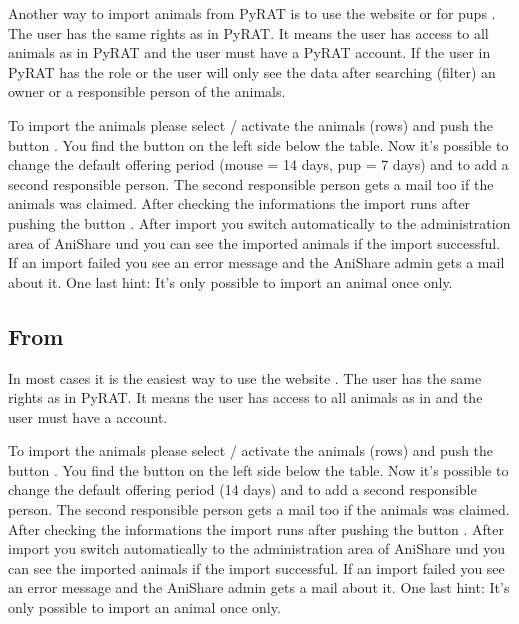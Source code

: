 \documentclass[letterpaper,10pt,openany,oneside,english]{sphinxmanual}
\begin{document}
Another way to import animals from PyRAT is to use the website  or for pups
. The user has the same rights as in PyRAT. It means the user has access to all animals
as in PyRAT and the user must have a PyRAT account. If the user in PyRAT has the role  or  the user will only
see the data after searching (filter) an owner or a responsible person of the animals.

\noindent{}

To import the animals please select / activate the animals (rows) and push the button . You find the button on the left
side below the table. Now it’s possible to change the default offering period (mouse = 14 days, pup = 7 days) and to add a second responsible person.
The second responsible person gets a mail too if the animals was claimed. After checking the informations the import runs after pushing the button
. After import you switch automatically to the administration area of AniShare und you can see the imported animals
if the import successful. If an import failed you see an error message and the AniShare admin gets a mail about it. One last hint: It’s only possible to
import an animal once only.


\subsection{From }
\label{\detokenize{index:from-tick-lab}}
In most cases it is the easiest way to use the website . The user has the same rights as in PyRAT. It means the user has access to all animals
as in  and the user must have a  account.

\noindent{}

To import the animals please select / activate the animals (rows) and push the button . You find the button on the left
side below the table. Now it’s possible to change the default offering period (14 days) and to add a second responsible person.
The second responsible person gets a mail too if the animals was claimed. After checking the informations the import runs after pushing the button
. After import you switch automatically to the administration area of AniShare und you can see the imported animals
if the import successful. If an import failed you see an error message and the AniShare admin gets a mail about it. One last hint: It’s only possible to
import an animal once only.
\end{document}
